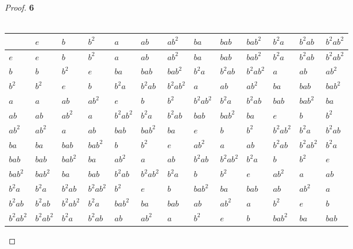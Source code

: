 \documentclass[11pt]{article}
\begin{document}
	\begin{proof}{\textbf{6}}\\\\ 
		\begin{adjustbox}{max width=\textwidth,center}
		\begin{tabular}{l|llllllllllll}
			    & $e$ & $b$ & $b^{2}$ & $a$ & $ab$ & $ab^{2}$ & $ba$ & $bab$ & $bab^{2}$ & $b^{2}a$ & $b^{2}ab$ & $b^{2}ab^{2}$ \\ \hline
			$e$ & $e$ & $b$ & $b^{2}$ & $a$ & $ab$ & $ab^{2}$ & $ba$ & $bab$ & $bab^{2}$ & $b^{2}a$ & $b^{2}ab$ & $b^{2}ab^{2}$ \\ 
			$b$ & $b$ & $b^{2}$ & $e$ & $ba$ & $bab$ & $bab^{2}$ & $b^{2}a$ & $b^{2}ab$ & $b^{2}ab^{2}$ & $a$ & $ab$ & $ab^{2}$ \\
		$b^{2}$ & $b^{2}$ & $e$ & $b$ & $b^{2}a$ & $b^{2}ab$ & $b^{2}ab^{2}$ & $a$ & $ab$ & $ab^{2}$ & $ba$ & $bab$ & $bab^{2}$ \\			
		    $a$ & $a$ & $ab$ & $ab^{2}$ & $e$ & $b$ & $b^{2}$ & $b^{2}ab^{2}$ & $b^{2}a$ & $b^{2}ab$ & $bab$ & $bab^{2}$ & $ba$ \\
		   $ab$ & $ab$ & $ab^{2}$ & $a$ & $b^2ab^2$ & $b^2a$ & $b^2ab$ & $bab$ & $bab^2$ & $ba$ & $e$ & $b$ & $b^2$ \\
	   $ab^{2}$ & $ab^2$ & $a$ & $ab$ & $bab$ & $bab^2$ & $ba$ & $e$ & $b$ & $b^2$ & $b^2ab^2$ & $b^2a$ & $b^2ab$ \\
	       $ba$ & $ba$ & $bab$ & $bab^2$ & $b$ & $b^2$ & $e$ & $ab^2$ & $a$ & $ab$ & $b^2ab$ & $b^2ab^2$ & $b^2a$ \\
	      $bab$ & $bab$ & $bab^2$ & $ba$ & $ab^2$ & $a$ & $ab$ & $b^2ab$ & $b^2ab^2$ & $b^2a$ & $b$ & $b^2$ & $e$ \\
	  $bab^{2}$ & $bab^2$ & $ba$ & $bab$ & $b^2ab$ & $b^2ab^2$ & $b^2a$ & $b$ & $b^2$ & $e$ & $ab^2$ & $a$ & $ab$ \\
	  $b^{2}a$ & $b^2a$ & $b^2ab$ & $b^2ab^2$ & $b^2$ & $e$ & $b$ & $bab^2$ & $ba$ & $bab$ & $ab$ & $ab^2$ & $a$ \\
	  $b^{2}ab$ & $b^2ab$ & $b^2ab^2$ & $b^2a$ & $bab^2$ & $ba$ & $bab$ & $ab$ & $ab^2$ & $a$ & $b^2$ & $e$ & $b$ \\
	  $b^{2}ab^{2}$ & $b^2ab^2$ & $b^2a$ & $b^2ab$ & $ab$ & $ab^2$ & $a$ & $b^2$ & $e$ & $b$ & $bab^2$ & $ba$ & $bab$
		\end{tabular}
		\end{adjustbox}
	\end{proof}
\end{document}
